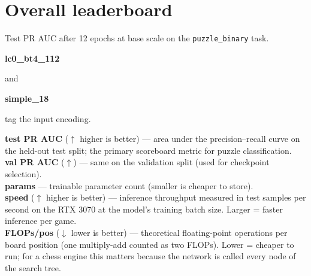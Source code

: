 \documentclass[10pt,a4paper]{article}
\newcommand{\pilllc}[0]{\colorbox{lc0bluebg}{\strut\textcolor{lc0blue}{\scriptsize\bfseries\sffamily lc0\_bt4\_112}}}
\newcommand{\pillsi}[0]{\colorbox{s18redbg}{\strut\textcolor{s18red}{\scriptsize\bfseries\sffamily simple\_18}}}
\begin{document}
\clearpage

\section{Overall leaderboard}

Test PR AUC after 12 epochs at base scale on the \texttt{puzzle\_binary} task.
\pilllc{} and \pillsi{} tag the input encoding.

\begin{tcolorbox}[callout, title=Metric legend]
\textbf{test PR AUC} ($\uparrow$ higher is better) --- area under the
precision--recall curve on the held-out test split; the primary scoreboard
metric for puzzle classification.\\
\textbf{val PR AUC} ($\uparrow$) --- same on the validation split (used for
checkpoint selection).\\
\textbf{params} --- trainable parameter count (smaller is cheaper to store).\\
\textbf{speed} ($\uparrow$ higher is better) --- inference throughput
measured in test samples per second on the RTX 3070 at the model's training
batch size. Larger = faster inference per game.\\
\textbf{FLOPs/pos} ($\downarrow$ lower is better) --- theoretical
floating-point operations per board position (one multiply-add counted as
two FLOPs). Lower = cheaper to run; for a chess engine this matters because
the network is called every node of the search tree.
\end{tcolorbox}
\end{document}
